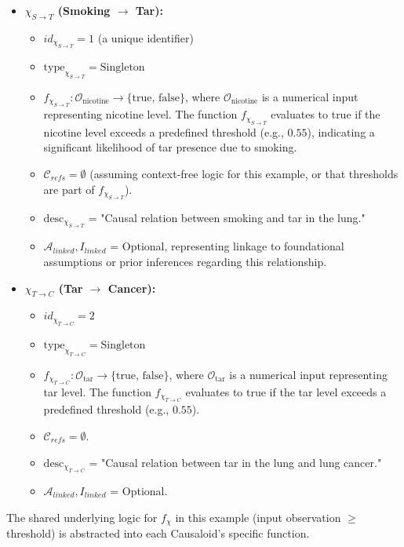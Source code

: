\begin{itemize}
    \item \textbf{\(\chi_{S \to T}\) (Smoking \(\rightarrow\) Tar):}
    \begin{itemize}
        \item \(id_{\chi_{S \to T}} = 1\) (a unique identifier)
        \item \(\text{type}_{\chi_{S \to T}} = \text{Singleton}\)
        \item \(f_{\chi_{S \to T}}: \mathcal{O}_{\text{nicotine}} \to \{\text{true, false}\}\), where \(\mathcal{O}_{\text{nicotine}}\) is a numerical input representing nicotine level. The function \(f_{\chi_{S \to T}}\) evaluates to true if the nicotine level exceeds a predefined threshold (e.g., \(0.55\)), indicating a significant likelihood of tar presence due to smoking.
        \item \(\mathcal{C}_{refs} = \emptyset\) (assuming context-free logic for this example, or that thresholds are part of \(f_{\chi_{S \to T}}\)).
        \item \(\text{desc}_{\chi_{S \to T}}\) = "Causal relation between smoking and tar in the lung."
        \item \(\mathcal{A}_{linked}, I_{linked}\) = Optional, representing linkage to foundational assumptions or prior inferences regarding this relationship.
    \end{itemize}
    \vspace{0.5em}
    \item \textbf{\(\chi_{T \to C}\) (Tar \(\rightarrow\) Cancer):}
    \begin{itemize}
        \item \(id_{\chi_{T \to C}} = 2\)
        \item \(\text{type}_{\chi_{T \to C}} = \text{Singleton}\)
        \item \(f_{\chi_{T \to C}}: \mathcal{O}_{\text{tar}} \to \{\text{true, false}\}\), where \(\mathcal{O}_{\text{tar}}\) is a numerical input representing tar level. The function \(f_{\chi_{T \to C}}\) evaluates to true if the tar level exceeds a predefined threshold (e.g., \(0.55\)).
        \item \(\mathcal{C}_{refs} = \emptyset\).
        \item \(\text{desc}_{\chi_{T \to C}}\) = "Causal relation between tar in the lung and lung cancer."
        \item \(\mathcal{A}_{linked}, I_{linked}\) = Optional.
    \end{itemize}
\end{itemize}
The shared underlying logic for \(f_\chi\) in this example (input observation \(\ge\) threshold) is abstracted into each Causaloid's specific function.

